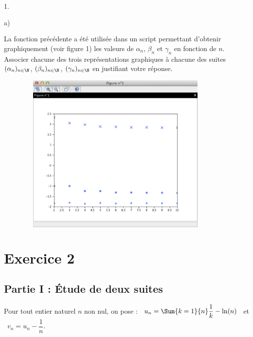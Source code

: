 \documentclass[11pt]{article}%
\begin{document}
\begin{noliste}{1.}
\begin{noliste}{a)}
  \item La fonction précédente a été utilisée dans un script
    permettant d'obtenir graphiquement (voir figure 1) les valeurs de
    $\alpha_{n}$, $\beta_{n}$ et $\gamma_{n}$ en fonction de $n$.\\
    Associer chacune des trois représentations graphiques à chacune
    des suites $(\alpha_{n})_{n\in \N}$, $(\beta_{n})_{n\in \N}$,
    $(\gamma_{n})_{n\in \N}$ en justifiant votre réponse.
    \begin{figure}[!h]
      \centering
      \includegraphics[width=10cm,
      height=8cm]{Figures/ECRICOME_2018/suites_alpha_beta_gamma.pdf}  
    \end{figure}




    
  \end{noliste}
\end{noliste}

\section*{Exercice 2}

\subsection*{Partie I : Étude de deux suites}

\noindent
Pour tout entier naturel $n$ non nul, on pose : \ $u_{n} = \Sum{k =
  1}{n} \dfrac{1}{k} - \ln(n)$ \ et \ $v_{n} = u_{n} - \dfrac{1}{n}$.
\end{document}
